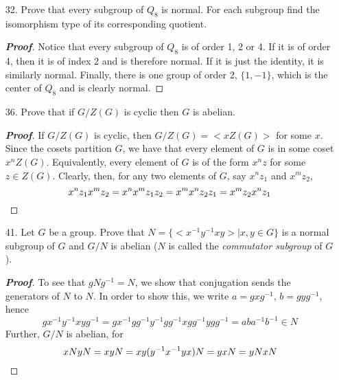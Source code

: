 \documentclass[12pt,leqno]{book}
\theoremstyle{definition}
\newenvironment{Proof}{\begin{proof}[\textnormal{\textbf{Proof}}]}{\end{proof}}
\begin{document}
\begin{enumerate}
 \item [32.] Prove that every subgroup of $Q_8$ is normal. For each subgroup find the isomorphism type of its corresponding quotient.
\begin{Proof}
 Notice that every subgroup of $Q_8$ is of order 1, 2 or 4. If it is of order 4, then it is of index 2 and is therefore normal. If it is just the identity, it is similarly normal. Finally, there is one group of order 2, $\{1,-1\}$, which is the center of $Q_8$ and is clearly normal.
\end{Proof}

 \item [36.] Prove that if $G/Z(G)$ is cyclic then $G$ is abelian. 

\begin{Proof}
 If $G/Z(G)$ is cyclic, then $G/Z(G)=<xZ(G)>$ for some $x$. Since the cosets partition $G$, we have that every element of $G$ is in some coset $x^nZ(G)$. Equivalently, every element of $G$ is of the form $x^nz$ for some $z\in Z(G)$. Clearly, then, for any two elements of $G$, say $x^nz_1$ and $x^mz_2$, \[x^nz_1x^mz_2=x^nx^mz_1z_2=x^mx^nz_2z_1=x^mz_2x^nz_1\qedhere\]
\end{Proof}

 \item [41.] Let $G$ be a group. Prove that $N=\{<x^{-1}y^{-1}xy>|x,y\in G\}$ is a normal subgroup of $G$ and $G/N$ is abelian ($N$ is called the \textit{commutator subgroup} of $G$). 
\begin{Proof}
 To see that $gNg^{-1}=N$, we show that conjugation sends the generators of $N$ to $N$. In order to show this, we write $a=gxg^{-1}$, $b=gyg^{-1}$, hence \[gx^{-1}y^{-1}xyg^{-1}=gx^{-1}gg^{-1}y^{-1}gg^{-1}xgg^{-1}ygg^{-1}=aba^{-1}b^{-1}\in N\] Further, $G/N$ is abelian, for \[xNyN=xyN=xy(y^{-1}x^{-1}yx)N=yxN=yNxN\qedhere\]
\end{Proof}

\end{enumerate}
\end{document}
